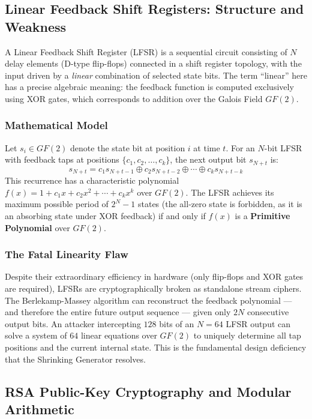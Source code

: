 \documentclass[conference, a4paper]{IEEEtran}
\begin{document}
\subsection{Linear Feedback Shift Registers: Structure and Weakness}

A Linear Feedback Shift Register (LFSR) is a sequential circuit consisting of $N$ delay elements (D-type flip-flops) connected in a shift register topology, with the input driven by a \textit{linear} combination of selected state bits. The term ``linear'' here has a precise algebraic meaning: the feedback function is computed exclusively using XOR gates, which corresponds to addition over the Galois Field $GF(2)$.

\subsubsection*{Mathematical Model}
Let $s_i \in GF(2)$ denote the state bit at position $i$ at time $t$. For an $N$-bit LFSR with feedback taps at positions $\{c_1, c_2, \ldots, c_k\}$, the next output bit $s_{N+t}$ is:
\begin{equation}
    s_{N+t} = c_1 s_{N+t-1} \oplus c_2 s_{N+t-2} \oplus \cdots \oplus c_k s_{N+t-k}
\end{equation}
This recurrence has a characteristic polynomial $f(x) = 1 + c_1 x + c_2 x^2 + \cdots + c_k x^k$ over $GF(2)$. The LFSR achieves its maximum possible period of $2^N - 1$ states (the all-zero state is forbidden, as it is an absorbing state under XOR feedback) if and only if $f(x)$ is a \textbf{Primitive Polynomial} over $GF(2)$.

\subsubsection*{The Fatal Linearity Flaw}
Despite their extraordinary efficiency in hardware (only flip-flops and XOR gates are required), LFSRs are cryptographically broken as standalone stream ciphers. The Berlekamp-Massey algorithm \cite{b5} can reconstruct the feedback polynomial — and therefore the entire future output sequence — given only $2N$ consecutive output bits. An attacker intercepting $128$ bits of an $N=64$ LFSR output can solve a system of $64$ linear equations over $GF(2)$ to uniquely determine all tap positions and the current internal state. This is the fundamental design deficiency that the Shrinking Generator resolves.

\subsection{RSA Public-Key Cryptography and Modular Arithmetic}
\end{document}
